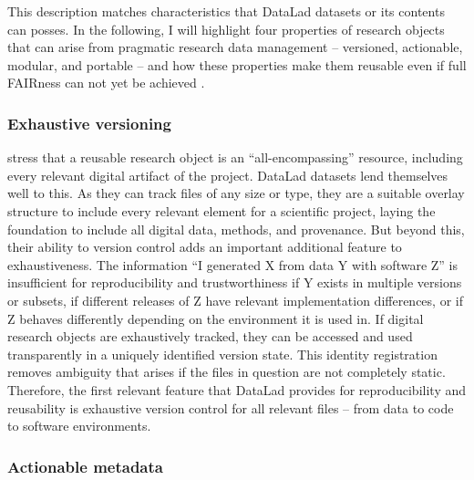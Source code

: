 This description matches characteristics that DataLad datasets or its contents can posses.
In the following, I will highlight four properties of research objects that can arise from pragmatic research data management -- versioned, actionable, modular, and portable -- and how these properties make them reusable  even if full FAIRness can not yet be achieved \citep{wagnerohbm2021}.

\subsubsection{Exhaustive versioning}

\citet{bechhofer2010research} stress that a reusable research object is an ``all-encompassing'' resource, including every relevant digital artifact of the project.
DataLad datasets lend themselves well to this.
As they can track files of any size or type, they are a suitable overlay structure to include every relevant element for a scientific project, laying the foundation to include all digital data, methods, and provenance.
But beyond this, their ability to version control adds an important additional feature to exhaustiveness.
The information ``I generated X from data Y with software Z'' is insufficient for reproducibility and trustworthiness if Y exists in multiple versions or subsets, if different releases of Z have relevant implementation differences, or if Z behaves differently depending on the environment it is used in.
If digital research objects are exhaustively tracked, they can be accessed and used transparently in a uniquely identified version state.
This identity registration removes ambiguity that arises if the files in question are not completely static.
Therefore, the first relevant feature that DataLad provides for reproducibility and reusability is exhaustive version control for all relevant files -- from data to code to software environments.

\subsubsection{Actionable metadata}

